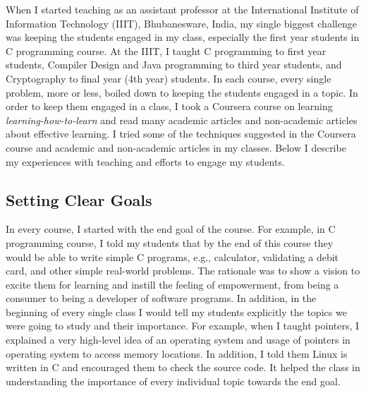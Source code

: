 \documentclass[11pt,a4paper,roman]{moderncv}
\begin{document}
When I started teaching as an assistant professor at the International Institute of Information 
Technology (IIIT), Bhubanesware, India,
my single biggest challenge was keeping the students engaged in my class, especially the first year 
students in C programming course. At the IIIT, I taught C programming to 
first year students, Compiler Design and Java programming to third year students, and
Cryptography to final year (4th year) students. In each course, every single 
problem,  more or less, boiled down to keeping the students engaged in a topic. 
In order to keep them engaged in a class, I took a Coursera course on 
learning \textit{learning-how-to-learn} and 
read many academic articles and non-academic articles about effective learning.
I tried some of the techniques suggested in the Coursera course and 
academic and non-academic articles in my classes. Below I 
describe my experiences with teaching and efforts to engage my students. 





\subsection{Setting Clear Goals}
In every course, I started with the end goal of the course. For example, 
in C programming course, I told my students that by the end of this 
course they would be 
able to write simple C programs, e.g., calculator, 
validating a debit card, and other simple real-world problems. The rationale was 
to show a vision to excite them 
for learning and instill the feeling of empowerment, from
being a consumer to being a developer of software programs.
In addition, in the beginning of every single class 
I would tell my students explicitly the topics we were going to study and 
their importance. For example, when I taught pointers, I explained a 
very high-level idea of an operating system and usage of pointers  
in operating system to access memory locations.
In addition, I told them
Linux is written in C and encouraged them to check the source code.
It helped the class in understanding the importance of 
every individual topic towards the end goal.
\end{document}
